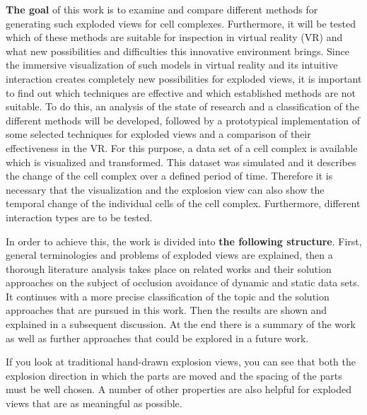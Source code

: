 \textbf{The goal} of this work is to examine and compare different methods for generating such exploded views for cell complexes. Furthermore, it will be tested which of these methods are suitable for inspection in virtual reality (VR) and what new possibilities and difficulties this innovative environment brings.
Since the immersive visualization of such models in virtual reality and its intuitive interaction creates completely new possibilities for exploded views, it is important to find out which techniques are effective and which established methods are not suitable.
To do this, an analysis of the state of research and a classification of the different methods will be developed, followed by a prototypical implementation of some selected techniques for exploded views and a comparison of their effectiveness in the VR.
For this purpose, a data set of a cell complex is available which is visualized and transformed. 
This dataset was simulated and it describes the change of the cell complex over a defined period of time. 
Therefore it is necessary that the visualization and the explosion view can also show the temporal change of the individual cells of the cell complex.
Furthermore, different interaction types are to be tested. 

In order to achieve this, the work is divided into \textbf{the following structure}. 
First, general terminologies and problems of exploded views are explained, then a thorough literature analysis takes place on related works and their solution approaches on the subject of occlusion avoidance of dynamic and static data sets.
It continues with a more precise classification of the topic and the solution approaches that are pursued in this work. 
Then the results are shown and explained in a subsequent discussion. At the end there is a summary of the work as well as further approaches that could be explored in a future work.

If you look at traditional hand-drawn explosion views, you can see that both the explosion direction in which the parts are moved and the spacing of the parts must be well chosen. 
A number of other properties are also helpful for exploded views that are as meaningful as possible.
